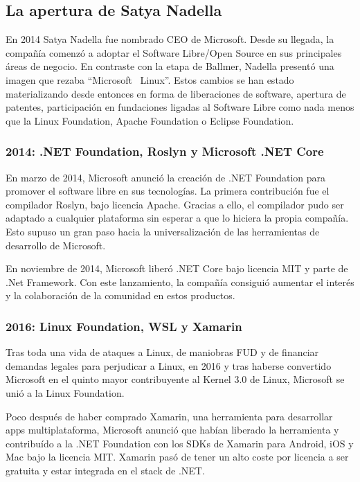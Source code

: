 \subsection{La apertura de Satya Nadella}
En 2014 Satya Nadella fue nombrado CEO de Microsoft. Desde su llegada, la compañía comenzó a adoptar el Software Libre/Open Source en sus principales áreas de negocio. En contraste con la etapa de Ballmer, Nadella presentó una imagen que rezaba ``Microsoft \heart\ Linux''. Estos cambios se han estado materializando desde entonces en forma de liberaciones de software, apertura de patentes, participación en fundaciones ligadas al Software Libre como nada menos que la Linux Foundation, Apache Foundation o Eclipse Foundation.

\subsubsection{2014: .NET Foundation, Roslyn y Microsoft .NET Core}
En marzo de 2014, Microsoft anunció la creación de .NET Foundation para promover el software libre en sus tecnologías. La primera contribución fue el compilador Roslyn, bajo licencia Apache. Gracias a ello, el compilador pudo ser adaptado a cualquier plataforma sin esperar a que lo hiciera la propia compañía. Esto supuso un gran paso hacia la universalización de las herramientas de desarrollo de Microsoft.\cite{xatakaw_2014:net_foundation}

En noviembre de 2014, Microsoft liberó .NET Core bajo licencia MIT y parte de .Net Framework. Con este lanzamiento, la compañía consiguió aumentar el interés y la colaboración de la comunidad en estos productos.\cite{arstechnica_2014:microsoft_open_sources_.NET}

\subsubsection{2016: Linux Foundation, WSL y Xamarin}
Tras toda una vida de ataques a Linux, de maniobras FUD y de financiar demandas legales para perjudicar a Linux, en 2016 y tras haberse convertido Microsoft en el quinto mayor contribuyente al Kernel 3.0 de Linux\cite{zdnet_2011:microsoft_contributes_linux}, Microsoft se unió a la Linux Foundation.\cite{arstechnica_2016:microsoft_joins_linux_foundation}

Poco después de haber comprado Xamarin, una herramienta para desarrollar apps multiplataforma, Microsoft anunció que habían liberado la herramienta y contribuído a la .NET Foundation con los SDKs de Xamarin para Android, iOS y Mac bajo la licencia MIT. Xamarin pasó de tener un alto coste por licencia a ser gratuita y estar integrada en el stack de .NET. \cite{genbeta_2016:microsoft_xamarin} \cite{petri_2016:microsoft_xamarin}

